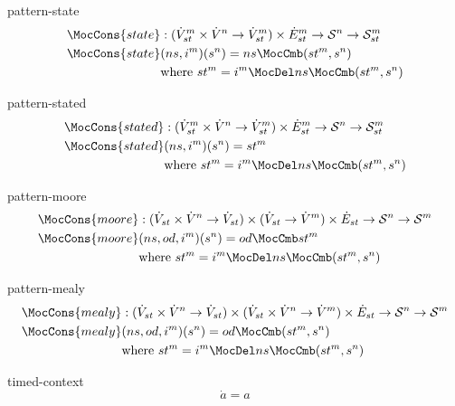 \documentclass[preview]{standalone}
\begin{document}
\begin{docimage}{pattern-state}
  \begin{align*}%
    \MocCons{state} &:({\dot{V}^m_{st} \times  \dot{V}^n \rightarrow \dot{V}^m_{st}})
                      \times \dot{E}^m_{st}
                      \rightarrow \mathcal{S}^n \rightarrow \mathcal{S}^m_{st} \\
    \MocCons{state} &(ns,i^m)(s^n) = ns \MocCmb (st^m, s^n) \\
                    &\text{where}\ st^m = i^m \MocDel ns \MocCmb (st^m, s^n) 
  \end{align*}
\end{docimage}

\begin{docimage}{pattern-stated}
  \begin{align*}%
    \MocCons{stated} &:({\dot{V}^m_{st} \times  \dot{V}^n \rightarrow \dot{V}^m_{st}})
                      \times \dot{E}^m_{st}
                      \rightarrow \mathcal{S}^n \rightarrow \mathcal{S}^m_{st} \\
    \MocCons{stated} &(ns,i^m)(s^n) = st^m \\
                    &\text{where}\ st^m = i^m \MocDel ns \MocCmb (st^m, s^n) 
  \end{align*}
\end{docimage}

\begin{docimage}{pattern-moore}
  \begin{align*}%
    \MocCons{moore} &:({\dot{V}_{st} \times  \dot{V}^n \rightarrow \dot{V}_{st}})
                      \times ({\dot{V}_{st} \rightarrow \dot{V}^m})
                      \times \dot{E}_{st}
                      \rightarrow \mathcal{S}^n \rightarrow \mathcal{S}^m \\
    \MocCons{moore} &(ns,od,i^m)(s^n) = od \MocCmb st^m \\
                    &\text{where}\ st^m = i^m \MocDel ns \MocCmb (st^m, s^n) 
  \end{align*}
\end{docimage}

\begin{docimage}{pattern-mealy}
  \begin{align*}%
    \MocCons{mealy} &:({\dot{V}_{st} \times  \dot{V}^n \rightarrow \dot{V}_{st}})
                      \times ({\dot{V}_{st} \times \dot{V}^n \rightarrow \dot{V}^m})
                      \times \dot{E}_{st}
                      \rightarrow \mathcal{S}^n \rightarrow \mathcal{S}^m \\
    \MocCons{mealy} &(ns,od,i^m)(s^n) = od \MocCmb (st^m, s^n) \\
                    &\text{where}\ st^m = i^m \MocDel ns \MocCmb (st^m, s^n) 
  \end{align*}
\end{docimage}

\begin{docimage}{timed-context}
  \begin{equation*}%
    \dot{a} = a  
  \end{equation*}
\end{docimage} 
\end{document}
